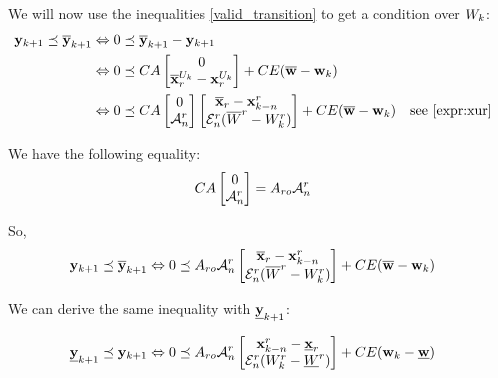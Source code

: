 We will now use the inequalities \ref{valid_transition} to get a condition over $W_k$:
\begin{align*}
 \mathbf{y}_{k+1} \preceq \overline{ \mathbf{y}}_{k+1}
& \Leftrightarrow
0 \preceq \overline{ \mathbf{y}}_{k+1} -  \mathbf{y}_{k+1} \\
& \Leftrightarrow
0 \preceq
C A \begin{bmatrix} 0 \\ \overline{ \mathbf{x}}^{U_k}_r- \mathbf{x}^{U_k}_r \end{bmatrix}
+ C E (\overline{ \mathbf{w}} - \mathbf{w}_{k})
\\
& \Leftrightarrow
0 \preceq
C A 
\begin{bmatrix} 0 \\ \mathcal{A}^r_n \end{bmatrix} 
\begin{bmatrix}
\overline{ \mathbf{x}}_r -  \mathbf{x}^r_{k-n}\ \\
\mathcal{E}^r_n (\overline{W}^r - W^r_k)
\end{bmatrix}
+ C E (\overline{ \mathbf{w}} - \mathbf{w}_{k})
&& \textrm{see \ref{expr:xur}}
\end{align*}

We have the following equality:
\begin{align*}
C A \begin{bmatrix} 0 \\ \mathcal{A}^r_n \end{bmatrix} 
& = A_{ro} \mathcal{A}^r_n
\end{align*}

So,
\begin{equation}\label{upp_equi}
\begin{split}
 \mathbf{y}_{k+1} \preceq \overline{ \mathbf{y}}_{k+1}
& \Leftrightarrow
0 \preceq
A_{ro} \mathcal{A}^r_n
\begin{bmatrix}
\overline{ \mathbf{x}}_r -  \mathbf{x}^r_{k-n} \\
\mathcal{E}^r_n (\overline{W}^r - W^r_k)
\end{bmatrix}
+ C E (\overline{ \mathbf{w}} - \mathbf{w}_{k})
\end{split}
\end{equation}

We can derive the same inequality with $\underline{ \mathbf{y}}_{k+1}$:

\begin{equation}\label{low_equi}
\begin{split}
\underline{ \mathbf{y}}_{k+1} \preceq  \mathbf{y}_{k+1}
& \Leftrightarrow
0 \preceq
A_{ro} \mathcal{A}^r_n
\begin{bmatrix}
 \mathbf{x}^r_{k-n} - \underline{ \mathbf{x}}_r \\
\mathcal{E}^r_n (W^r_k - \underline{W}^r)
\end{bmatrix}
+ C E ( \mathbf{w}_{k} - \underline{ \mathbf{w}})
\end{split}
\end{equation}

